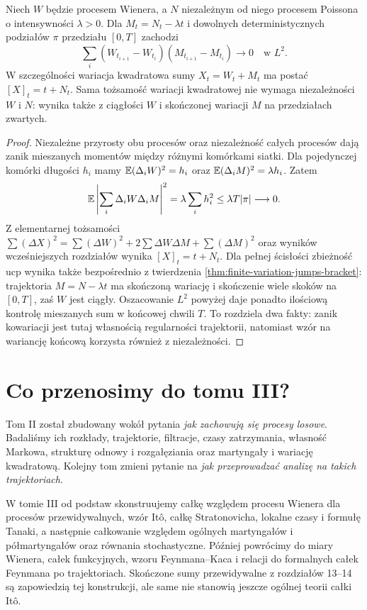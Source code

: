 \begin{stwierdzenie}
Niech $W$ będzie procesem Wienera, a $N$ niezależnym
od niego procesem Poissona o intensywności $\lambda>0$.
Dla $M_t=N_t-\lambda t$ i dowolnych deterministycznych
podziałów $\pi$ przedziału $[0,T]$ zachodzi
\[
\sum_i(W_{t_{i+1}}-W_{t_i})
(M_{t_{i+1}}-M_{t_i})\longrightarrow0
\quad\text{w }L^2.
\]
W szczególności wariacja kwadratowa sumy
$X_t=W_t+M_t$ ma postać $[X]_t=t+N_t$.
Sama tożsamość wariacji kwadratowej nie wymaga
niezależności $W$ i $N$: wynika także z ciągłości $W$
i skończonej wariacji $M$ na przedziałach zwartych.
\end{stwierdzenie}
\begin{proof}
Niezależne przyrosty obu procesów oraz niezależność
całych procesów dają zanik mieszanych momentów
między różnymi komórkami siatki. Dla pojedynczej komórki
długości $h_i$ mamy
$\mathbb{E}(\Delta_iW)^2=h_i$ oraz
$\mathbb{E}(\Delta_iM)^2=\lambda h_i$.
Zatem
\[
\mathbb{E}\left|\sum_i\Delta_iW\Delta_iM\right|^2
=\lambda\sum_i h_i^2\le\lambda T|\pi|\longrightarrow0.
\]
Z elementarnej tożsamości
$\sum(\Delta X)^2=\sum(\Delta W)^2+
2\sum\Delta W\Delta M+\sum(\Delta M)^2$
oraz wyników wcześniejszych rozdziałów wynika
$[X]_t=t+N_t$. Dla pełnej ścisłości zbieżność ucp
wynika także bezpośrednio z twierdzenia
\ref{thm:finite-variation-jumps-bracket}: trajektoria
$M=N-\lambda t$ ma skończoną wariację i skończenie
wiele skoków na $[0,T]$, zaś $W$ jest ciągły.
Oszacowanie $L^2$ powyżej daje ponadto ilościową kontrolę
mieszanych sum w końcowej chwili $T$.
To rozdziela dwa fakty: zanik kowariacji jest tutaj
własnością regularności trajektorii, natomiast wzór
na wariancję końcową korzysta również z niezależności.
\end{proof}

\section{Co przenosimy do tomu III?}
Tom II został zbudowany wokół pytania \emph{jak zachowują
się procesy losowe}. Badaliśmy ich rozkłady, trajektorie,
filtracje, czasy zatrzymania, własność Markowa, strukturę
odnowy i rozgałęziania oraz martyngały i wariację
kwadratową. Kolejny tom zmieni pytanie na
\emph{jak przeprowadzać analizę na takich trajektoriach}.

\begin{uwaga}
W tomie III od podstaw skonstruujemy całkę względem
procesu Wienera dla procesów przewidywalnych, wzór
Itô, całkę Stratonovicha, lokalne czasy i formułę
Tanaki, a następnie całkowanie względem ogólnych
martyngałów i półmartyngałów oraz równania stochastyczne.
Później powrócimy do miary Wienera, całek funkcyjnych,
wzoru Feynmana--Kaca i relacji do formalnych całek
Feynmana po trajektoriach. Skończone sumy przewidywalne
z rozdziałów 13--14 są zapowiedzią tej konstrukcji,
ale same nie stanowią jeszcze ogólnej teorii całki Itô.
\end{uwaga}

